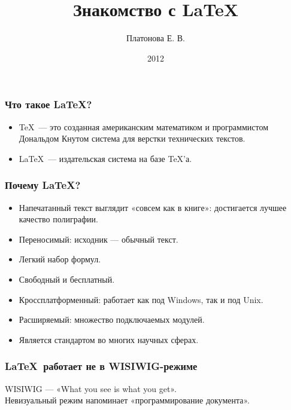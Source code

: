 \documentclass{beamer}
\begin{document}
\title{Знакомство с \LaTeX}
\author{Платонова Е. В.}
\date{2012}
\frame{\titlepage}

\begin{frame}
  \frametitle{Что такое \LaTeX ?}
\begin{itemize}
\item \TeX\ --- это созданная американским математиком и программистом Дональдом Кнутом система для верстки технических текстов.

\item \LaTeX\ --- издательская система на базе \TeX 'а.
\end{itemize}
\end{frame}


\begin{frame}
  \frametitle{Почему \LaTeX ?}
\begin{itemize}
\item Напечатанный текст выглядит «совсем как в книге»: достигается лучшее качество полиграфии.
\item Переносимый: исходник — обычный текст.
\item Легкий набор формул.
\item Свободный и бесплатный.
\item Кроссплатформенный: работает как под Windows, так и под Unix.
\item Расширяемый: множество подключаемых модулей.
\item Является стандартом во многих научных сферах.
\end{itemize}
\end{frame}

\begin{frame}
  \frametitle{\LaTeX\ работает не в WISIWIG-режиме}
  
  WISIWIG — «What you see is what you get».
  \\
  Невизуальный режим напоминает «программирование документа».

\end{frame}
\end{document}
